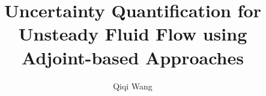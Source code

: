 \documentclass[11pt]{article}
\title{Uncertainty Quantification for Unsteady Fluid Flow using
           Adjoint-based Approaches}
\author{Qiqi Wang}
\begin{document}
\maketitle



\endabstract
\end{document}
